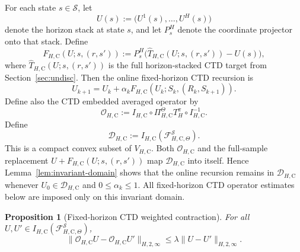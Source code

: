 \documentclass{article}
\newtheorem{proposition}[theorem]{Proposition}
\newcommand{\X}{\mathcal{S}}
\begin{document}
For each state $s\in \X$, let
\begin{equation}
U(s):=\bigl(U^1(s),\dots,U^H(s)\bigr)
\end{equation}
denote the horizon stack at state $s$, and let $P_s^H$ denote the coordinate projector onto that stack. Define
\begin{equation}
F_{H,\mathrm C}(U;s,(r,s')) := P_s^H\bigl(\widehat T_{H,\mathrm C}(U;s,(r,s'))-U(s)\bigr),
\end{equation}
where $\widehat T_{H,\mathrm C}(U;s,(r,s'))$ is the full horizon-stacked CTD target from Section~\ref{sec:undisc}. Then the online fixed-horizon CTD recursion is
\begin{equation}
U_{k+1}=U_k+\alpha_k F_{H,\mathrm C}(U_k;S_k,(R_k,S_{k+1})).
\end{equation}
Define also the CTD embedded averaged operator by
\begin{equation}
\mathcal O_{H,\mathrm C} := I_{H,\mathrm C}\circ \Pi_{H,\mathrm C}^{\Theta} T_H^\pi \circ I_{H,\mathrm C}^{-1}.
\end{equation}
Define
\begin{equation}
\mathcal D_{H,\mathrm C}:=I_{H,\mathrm C}(\mathcal F_{H,\mathrm C,\Theta}^{\X}).
\end{equation}
This is a compact convex subset of $V_{H,\mathrm C}$. Both $\mathcal O_{H,\mathrm C}$ and the full-sample replacement $U+F_{H,\mathrm C}(U;s,(r,s'))$ map $\mathcal D_{H,\mathrm C}$ into itself. Hence Lemma~\ref{lem:invariant-domain} shows that the online recursion remains in $\mathcal D_{H,\mathrm C}$ whenever $U_0\in\mathcal D_{H,\mathrm C}$ and $0\le\alpha_k\le1$. All fixed-horizon CTD operator estimates below are imposed only on this invariant domain.

\begin{proposition}[Fixed-horizon CTD weighted contraction]
\label{prop:fh-ctd-contract-app}
For all $U,U' \in I_{H,\mathrm C}(\mathcal F_{H,\mathrm C,\Theta}^\X)$,
\begin{equation}
\lVert \mathcal O_{H,\mathrm C}U-\mathcal O_{H,\mathrm C}U'\rVert_{H,2,\infty} \le \lambda \lVert U-U'\rVert_{H,2,\infty}.
\end{equation}
\end{proposition}
\end{document}
